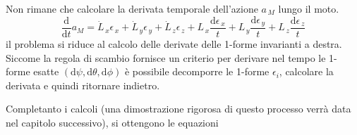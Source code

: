 \documentclass[11pt]{report}
\theoremstyle{plain}
\theoremstyle{definition}
\theoremstyle{remark}
\begin{document}
Non rimane che calcolare la derivata temporale dell'azione $a_{\, M}$ lungo il moto.
\begin{displaymath}
\dfrac{\textrm{d}}{\textrm{d}t} a_{M} = \dot{L}_{\, x}\epsilon_{\, x} + \dot{L}_{\, y}\epsilon_{\, y} + \dot{L}_{\, z}\epsilon_{\, z} + L_{\, x}\dfrac{\textrm{d}\epsilon_{\, x}}{t} + L_{\, y}\dfrac{\textrm{d}\epsilon_{\, y}}{t} + L_{\, z}\dfrac{\textrm{d}\epsilon_{\, z}}{t}
\end{displaymath}
il problema si riduce al calcolo delle derivate delle 1-forme invarianti a destra.
Siccome la regola di scambio fornisce un criterio per derivare nel tempo le 1-forme esatte $(\textrm{d} \psi, \textrm{d} \theta , \textrm{d} \phi )$ è possibile decomporre le 1-forme $\epsilon_{i} $, calcolare la derivata e quindi ritornare indietro.

Completanto i calcoli (una dimostrazione rigorosa di questo processo verrà data nel capitolo successivo), si ottengono le equazioni
\end{document}
